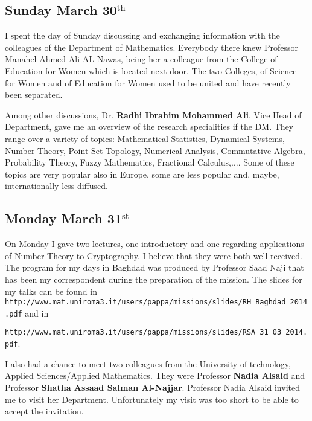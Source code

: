 \documentclass[12pt,a4paper]{scrartcl}
\begin{document}
\subsection{Sunday March 30$^{\textrm{th}}$}
I spent the day of Sunday discussing and exchanging information with the colleagues of the Department of Mathematics. Everybody there knew Professor Manahel
Ahmed Ali AL-Nawas, being her a colleague from the College of Education for Women which is located next-door.  The two Colleges, of Science for Women and of Education for Women
used to be united and have recently been separated.

Among other discussions, Dr. \textbf{Radhi Ibrahim Mohammed Ali}, Vice Head of Department, gave me an overview of the research specialities if the DM. They range over
a variety of topics: Mathematical Statistics, Dynamical Systems, Number Theory, Point Set Topology, Numerical Analysis, Commutative Algebra, Probability Theory, Fuzzy Mathematics,
Fractional Calculus,$\ldots$. Some of these topics are very popular also in Europe, some are less popular and, maybe, internationally less diffused. 
 
\subsection{Monday March 31$^{\textrm{st}}$}

On Monday I gave two lectures, one introductory and one regarding applications of Number Theory to Cryptography. I believe that they were both
well received. The program for my days in Baghdad was produced by Professor Saad Naji that has been my correspondent during the
preparation of the mission. The slides for my talks can be found in\hfill \\
\texttt{http://www.mat.uniroma3.it/users/pappa/missions/slides/RH\_Baghdad\_2014.pdf} and in

\noindent \texttt{http://www.mat.uniroma3.it/users/pappa/missions/slides/RSA\_31\_03\_2014.pdf}.

I also had a chance to meet two colleagues from the University of technology,
Applied Sciences/Applied Mathematics. They were Professor \textbf{Nadia Alsaid} %
and  Professor \textbf{Shatha Assaad Salman Al-Najjar}. %
Professor Nadia Alsaid invited me to visit her Department. Unfortunately my visit was too short to be able to accept the 
invitation.
\end{document}
